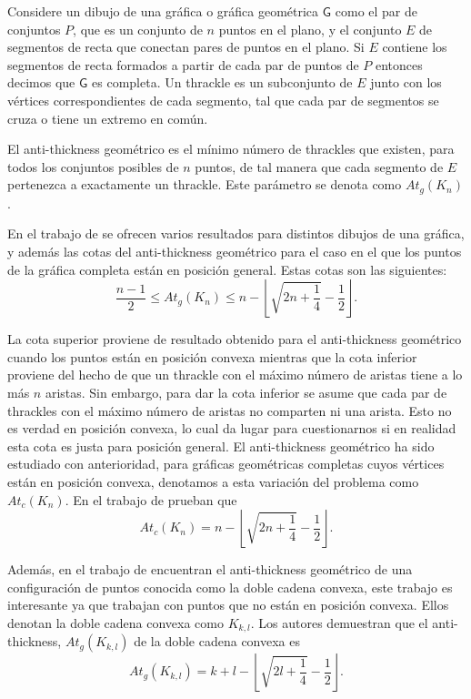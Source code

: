 Considere un dibujo de una gráfica o gráfica geométrica $\mathsf{G}$ como el par de conjuntos $P$, que es un conjunto de $n$ puntos en el plano, y el conjunto $E$ de segmentos de recta que conectan pares de puntos en el plano. Si $E$ contiene los segmentos de recta formados a partir de cada par de puntos de $P$ entonces decimos que $\mathsf{G}$ es completa. Un thrackle es un subconjunto de $E$ junto con los vértices correspondientes de cada segmento, tal que cada par de segmentos se cruza o tiene un extremo en común.

El anti-thickness geométrico es el mínimo número de thrackles que existen, para todos los conjuntos posibles de $n$ puntos, de tal manera que cada segmento de $E$ pertenezca a exactamente un thrackle. Este parámetro se denota como $At_g(K_n)$.

En el trabajo de \cite{Dujmovic2017} se ofrecen varios resultados para distintos dibujos de una gráfica, y
además las cotas del anti-thickness geométrico para el caso en el que los puntos de la gráfica completa
están en posición general. Estas cotas son las siguientes:
\[ \frac{n-1}{2} \leq At_g(K_n) \leq n - \left\lfloor\sqrt{2n + \frac{1}{4}}- \frac{1}{2}\right\rfloor.\]

La cota superior proviene de resultado obtenido para el anti-thickness geométrico cuando los puntos están
en posición convexa mientras que la cota inferior proviene del hecho de que un thrackle con el máximo
número de aristas tiene a lo más $n$ aristas. Sin embargo, para dar la cota inferior se asume que cada par
de thrackles con el máximo número de aristas no comparten ni una arista. Esto no es verdad en posición
convexa, lo cual da lugar para cuestionarnos si en realidad esta cota es justa para posición general.
El anti-thickness geométrico ha sido estudiado con anterioridad, para gráficas geométricas completas cuyos
vértices están en posición convexa, denotamos a esta variación del problema como $At_c(K_n)$. En el trabajo de \cite{Fabila-Monroy2018} prueban que \[At_c(K_n) = n - \left\lfloor\sqrt{2n + \frac{1}{4}}-
\frac{1}{2}\right\rfloor.\]

Además, en el trabajo de \cite{Lomeli2018} encuentran el anti-thickness geométrico de una configuración de
puntos conocida como la doble cadena convexa, este trabajo es interesante ya que trabajan con puntos que no
están en posición convexa. Ellos denotan la doble cadena convexa como $K_{k,l}$. Los autores
demuestran que el anti-thickness, $At_g(K_{k,l})$ de la doble cadena convexa es \[ At_g(K_{k,l}) = k+l
-\left\lfloor\sqrt{2l + \frac{1}{4}} -\frac{1}{2}\right\rfloor. \]

